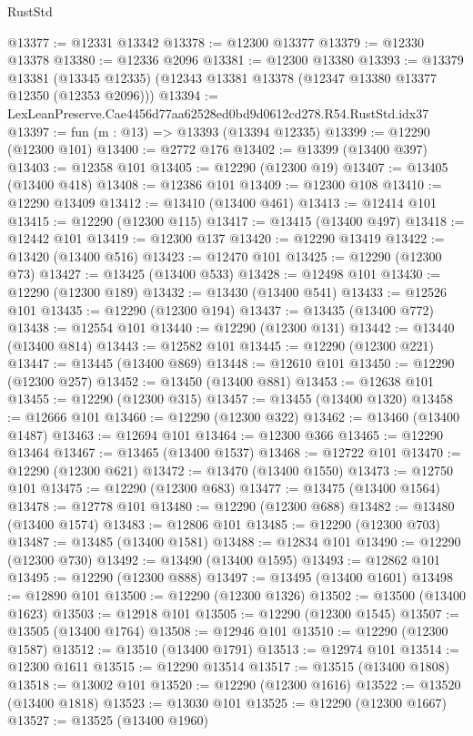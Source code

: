 \begin{lexlean}{RustStd}
\begin{coremodule}
@13377 := @12331 @13342
@13378 := @12300 @13377
@13379 := @12330 @13378
@13380 := @12336 @2096
@13381 := @12300 @13380
@13393 := @13379
    @13381
    (@13345 @12335)
    (@12343 @13381 @13378 (@12347 @13380 @13377 @12350 (@12353 @2096)))
@13394 := LexLeanPreserve.Cae4456d77aa62528ed0bd9d0612cd278.R54.RustStd.idx37
@13397 := fun (m : @13) => @13393 (@13394 @12335)
@13399 := @12290 (@12300 @101)
@13400 := @2772 @176
@13402 := @13399 (@13400 @397)
@13403 := @12358 @101
@13405 := @12290 (@12300 @19)
@13407 := @13405 (@13400 @418)
@13408 := @12386 @101
@13409 := @12300 @108
@13410 := @12290 @13409
@13412 := @13410 (@13400 @461)
@13413 := @12414 @101
@13415 := @12290 (@12300 @115)
@13417 := @13415 (@13400 @497)
@13418 := @12442 @101
@13419 := @12300 @137
@13420 := @12290 @13419
@13422 := @13420 (@13400 @516)
@13423 := @12470 @101
@13425 := @12290 (@12300 @73)
@13427 := @13425 (@13400 @533)
@13428 := @12498 @101
@13430 := @12290 (@12300 @189)
@13432 := @13430 (@13400 @541)
@13433 := @12526 @101
@13435 := @12290 (@12300 @194)
@13437 := @13435 (@13400 @772)
@13438 := @12554 @101
@13440 := @12290 (@12300 @131)
@13442 := @13440 (@13400 @814)
@13443 := @12582 @101
@13445 := @12290 (@12300 @221)
@13447 := @13445 (@13400 @869)
@13448 := @12610 @101
@13450 := @12290 (@12300 @257)
@13452 := @13450 (@13400 @881)
@13453 := @12638 @101
@13455 := @12290 (@12300 @315)
@13457 := @13455 (@13400 @1320)
@13458 := @12666 @101
@13460 := @12290 (@12300 @322)
@13462 := @13460 (@13400 @1487)
@13463 := @12694 @101
@13464 := @12300 @366
@13465 := @12290 @13464
@13467 := @13465 (@13400 @1537)
@13468 := @12722 @101
@13470 := @12290 (@12300 @621)
@13472 := @13470 (@13400 @1550)
@13473 := @12750 @101
@13475 := @12290 (@12300 @683)
@13477 := @13475 (@13400 @1564)
@13478 := @12778 @101
@13480 := @12290 (@12300 @688)
@13482 := @13480 (@13400 @1574)
@13483 := @12806 @101
@13485 := @12290 (@12300 @703)
@13487 := @13485 (@13400 @1581)
@13488 := @12834 @101
@13490 := @12290 (@12300 @730)
@13492 := @13490 (@13400 @1595)
@13493 := @12862 @101
@13495 := @12290 (@12300 @888)
@13497 := @13495 (@13400 @1601)
@13498 := @12890 @101
@13500 := @12290 (@12300 @1326)
@13502 := @13500 (@13400 @1623)
@13503 := @12918 @101
@13505 := @12290 (@12300 @1545)
@13507 := @13505 (@13400 @1764)
@13508 := @12946 @101
@13510 := @12290 (@12300 @1587)
@13512 := @13510 (@13400 @1791)
@13513 := @12974 @101
@13514 := @12300 @1611
@13515 := @12290 @13514
@13517 := @13515 (@13400 @1808)
@13518 := @13002 @101
@13520 := @12290 (@12300 @1616)
@13522 := @13520 (@13400 @1818)
@13523 := @13030 @101
@13525 := @12290 (@12300 @1667)
@13527 := @13525 (@13400 @1960)

\end{coremodule}
\end{lexlean}
